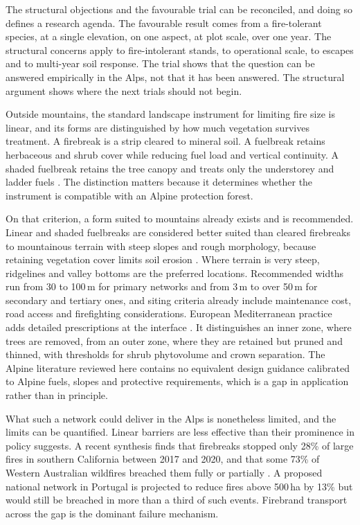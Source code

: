 \documentclass[11pt,a4paper]{article}
\begin{document}
The structural objections and the favourable trial can be reconciled, and doing so defines a research agenda. The favourable result comes from a fire-tolerant species, at a single elevation, on one aspect, at plot scale, over one year. The structural concerns apply to fire-intolerant stands, to operational scale, to escapes and to multi-year soil response. The trial shows that the question can be answered empirically in the Alps, not that it has been answered. The structural argument shows where the next trials should not begin.

Outside mountains, the standard landscape instrument for limiting fire size is linear, and its forms are distinguished by how much vegetation survives treatment. A firebreak is a strip cleared to mineral soil. A fuelbreak retains herbaceous and shrub cover while reducing fuel load and vertical continuity. A shaded fuelbreak retains the tree canopy and treats only the understorey and ladder fuels \citep{ascoli_firebreak_2018}. The distinction matters because it determines whether the instrument is compatible with an Alpine protection forest.

On that criterion, a form suited to mountains already exists and is recommended. Linear and shaded fuelbreaks are considered better suited than cleared firebreaks to mountainous terrain with steep slopes and rough morphology, because retaining vegetation cover limits soil erosion \citep{ascoli_firebreak_2018}. Where terrain is very steep, ridgelines and valley bottoms are the preferred locations. Recommended widths run from 30 to 100\,m for primary networks and from 3\,m to over 50\,m for secondary and tertiary ones, and siting criteria already include maintenance cost, road access and firefighting considerations. European Mediterranean practice adds detailed prescriptions at the interface \citep{rigolot_recommendations_2003}. It distinguishes an inner zone, where trees are removed, from an outer zone, where they are retained but pruned and thinned, with thresholds for shrub phytovolume and crown separation. The Alpine literature reviewed here contains no equivalent design guidance calibrated to Alpine fuels, slopes and protective requirements, which is a gap in application rather than in principle.

What such a network could deliver in the Alps is nonetheless limited, and the limits can be quantified. Linear barriers are less effective than their prominence in policy suggests. A recent synthesis finds that firebreaks stopped only 28\% of large fires in southern California between 2017 and 2020, and that some 73\% of Western Australian wildfires breached them fully or partially \citep{zong_effectiveness_2026}. A proposed national network in Portugal is projected to reduce fires above 500\,ha by 13\% but would still be breached in more than a third of such events. Firebrand transport across the gap is the dominant failure mechanism.
\end{document}

